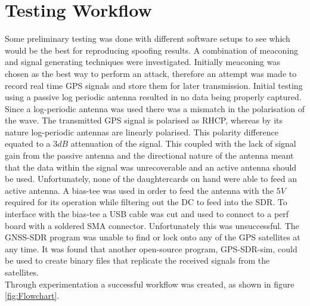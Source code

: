 
\section{Testing Workflow}

Some preliminary testing was done with different software setups to see which would be the best for reproducing spoofing results. A combination of meaconing and signal
generating techniques were investigated. Initially meaconing was chosen as the best way to perform an attack, therefore an attempt was made to record real time GPS signals
and store them for later transmission. Initial testing using a passive log periodic antenna resulted in no data being properly captured. Since a log-periodic antenna was
used there was a mismatch in the polarisation of the wave. The transmitted GPS signal is polarised as RHCP, whereas by its nature log-periodic antennas are linearly
polarised. This polarity difference equated to a $3dB$ attenuation of the signal. This coupled with the lack of signal gain from the passive antenna and the directional nature of the antenna
meant that the data within the signal was unrecoverable and an active antenna should be used. Unfortunately, none of the daughtercards on hand were able to feed an active
antenna. A bias-tee was used in order to feed the antenna with the $5V$ required for its operation while filtering out the DC to feed into the SDR. To interface with the
bias-tee a USB cable was cut and used to connect to a perf board with a soldered SMA connector. Unfortunately this was unsuccessful. The GNSS-SDR program was unable to
find or lock onto any of the GPS satellites at any time. It was found that another open-source program, GPS-SDR-sim, could be used to create binary files that replicate
the received signals from the satellites. 
\\Through experimentation a successful workflow was created, as shown in figure \ref{fig:Flowchart}.

